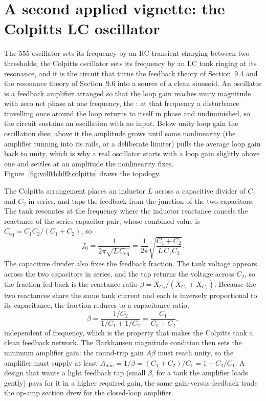 \section{A second applied vignette: the Colpitts LC oscillator}
\label{sec:vol04ch09:colpitts}

The 555 oscillator sets its frequency by an RC transient charging between two
thresholds; the Colpitts oscillator sets its frequency by an LC tank ringing
at its resonance, and it is the circuit that turns the feedback theory of
Section~9.4 and the resonance theory of Section~9.6 into a source of a clean
sinusoid. An oscillator is a feedback amplifier arranged so that the loop gain
reaches unity magnitude with zero net phase at one frequency, the
: at that frequency a disturbance travelling once
around the loop returns to itself in phase and undiminished, so the circuit
sustains an oscillation with no input. Below unity loop gain the oscillation
dies; above it the amplitude grows until some nonlinearity (the amplifier
running into its rails, or a deliberate limiter) pulls the average loop gain
back to unity, which is why a real oscillator starts with a loop gain slightly
above one and settles at an amplitude the nonlinearity fixes.
Figure~\ref{fig:vol04ch09:colpitts} draws the topology.



The Colpitts arrangement places an inductor $L$ across a capacitive divider of
$C_1$ and $C_2$ in series, and taps the feedback from the junction of the two
capacitors. The tank resonates at the frequency where the inductor reactance
cancels the reactance of the series capacitor pair, whose combined value is
$C_{\text{eq}} = C_1 C_2/(C_1 + C_2)$, so
\[
f_0 = \frac{1}{2\pi\sqrt{L\,C_{\text{eq}}}}
= \frac{1}{2\pi}\sqrt{\frac{C_1 + C_2}{L\,C_1 C_2}}.
\]
The capacitive divider also fixes the feedback fraction. The tank voltage
appears across the two capacitors in series, and the tap returns the voltage
across $C_2$, so the fraction fed back is the reactance ratio $\beta =
X_{C_2}/(X_{C_1}+X_{C_2})$. Because the two reactances share the same tank
current and each is inversely proportional to its capacitance, the fraction
reduces to a capacitance ratio,
\[
\beta = \frac{1/C_2}{1/C_1 + 1/C_2} = \frac{C_1}{C_1 + C_2},
\]
independent of frequency, which is the property that makes the Colpitts tank a
clean feedback network. The Barkhausen magnitude condition then sets the
minimum amplifier gain: the round-trip gain $A\beta$ must reach unity, so the
amplifier must supply at least $A_{\min} = 1/\beta = (C_1 + C_2)/C_1 = 1 +
C_2/C_1$. A design that wants a light feedback tap (small $\beta$, for a tank
the amplifier loads gently) pays for it in a higher required gain, the same
gain-versus-feedback trade the op-amp section drew for the closed-loop
amplifier.

